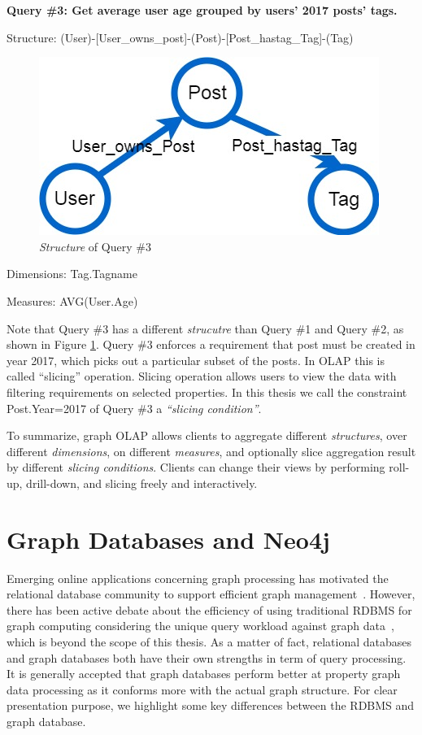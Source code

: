 \textbf{Query \#3: 		Get average user age grouped by users’ 2017 posts’ tags.}

Structure:	(User)-[User\_owns\_post]-(Post)-[Post\_hastag\_Tag]-(Tag)
\begin{figure}[H]
\centering
\includegraphics[scale=0.5]{pic/meta2.jpg}
\caption{\textit{Structure} of Query \#3}
\label{fig:2:3}
\end{figure}


Dimensions:	{Tag.Tagname}

Measures:	{AVG(User.Age)}

Note that Query \#3 has a different \textit{strucutre} than Query \#1 and Query \#2, as shown in Figure \ref{fig:2:3}. Query \#3 enforces a requirement that post must be created in year 2017, which picks out a particular subset of  the posts. In OLAP this is called ``slicing'' operation. Slicing operation allows users to view the data with filtering requirements on selected properties. In this thesis we call the constraint {Post.Year=2017}  of Query \#3 a \textit{``slicing condition''}.

To summarize, graph OLAP allows clients to aggregate different \textit{structures}, over different \textit{dimensions}, on different \textit{measures}, and optionally slice aggregation result by different \textit{slicing conditions}. Clients can change their views by performing roll-up, drill-down, and slicing freely and interactively.


\section{Graph Databases and Neo4j}
 Emerging online applications concerning graph processing has motivated the relational database community to support efficient graph management~\cite{}. However, there has been active debate about the efficiency of using traditional RDBMS for graph computing considering the unique query workload against graph data~\cite{}, which is beyond the scope of this thesis. As a matter of fact, relational databases and graph databases both have their own strengths in term of query processing.  It is generally accepted that graph databases perform better at property graph data processing as it conforms more with the actual graph structure. For clear presentation purpose, we highlight some key differences between the RDBMS and graph database. 

